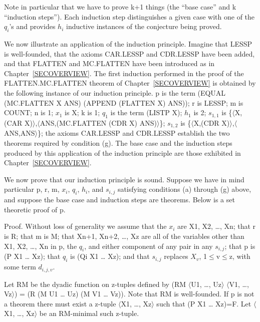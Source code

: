 \documentclass[11pt]{book}
\begin{document}
\nopagebreak\par\hrulefill\nopagebreak\par
Note in particular that we have to prove k+1 things (the ``base case'' and k
``induction steps'').  Each induction step distinguishes a given case with
one of the $q_{i}$'s and provides $h_{i}$ inductive instances of the conjecture
being proved.

We now illustrate an application of the induction principle.
Imagine that LESSP is well-founded,
that the axioms CAR.LESSP and CDR.LESSP have been added, and that
FLATTEN and MC.FLATTEN have been introduced as in Chapter~\ref{SECOVERVIEW}.
The first induction performed in the proof of the FLAT\-TEN.MC.FLAT\-TEN
theorem of Chapter~\ref{SECOVERVIEW} is obtained by the following
instance of our induction principle.  p is the term (EQUAL (MC.FLAT\-TEN X ANS)
(APPEND (FLATTEN X) ANS)); r is LESSP; m is COUNT; n is 1; $x_{1}$ is X;
k is 1; $q_{1}$ is the term (LISTP X); $h_{1}$ is 2; $s_{1,1}$ is
\{$\langle$X,(CAR X)$\rangle$,$\langle$ANS,(MC.FLAT\-TEN (CDR X) ANS)$\rangle$\}; $s_{1,2}$ is
\{$\langle$X,(CDR X)$\rangle$,$\langle$ANS,ANS$\rangle$\}; the axioms CAR.LESSP and CDR.LESSP establish
the two theorems required by condition (g).  The base case and the induction
steps produced by this application of the induction principle
are those exhibited in Chapter~\ref{SECOVERVIEW}.

We now prove that our induction principle is sound.
Suppose we have in mind particular p, r, m, $x_{i}$,
$q_{i}$, $h_{i}$, and $s_{i,j}$ satisfying conditions (a) through
(g) above, and suppose the base case and induction steps are
theorems.  Below is a set theoretic proof of p.

Proof.  Without loss of generality we assume that the
$x_{i}$ are X1, X2, \ldots{}, Xn; that r is R; that m is M;
that Xn+1, Xn+2, \ldots{}, Xz are all of the variables other
than X1, X2, \ldots{}, Xn in p, the $q_{i}$, and either component
of any pair in any $s_{i,j}$; that p is (P X1 \ldots{} Xz); that
$q_{i}$ is (Qi X1 \ldots{} Xz); and that $s_{i,j}$ replaces $X_{v}$, 1$\leq$v$\leq$z,
with some term $d_{i,j,v}$.

Let RM be the dyadic function on z-tuples defined by
(RM $\langle$U1, \ldots{}, Uz$\rangle$ $\langle$V1, \ldots{}, Vz$\rangle$) = (R (M U1 \ldots{} Uz) (M V1 \ldots{} Vz)).
Note that RM is well-founded.  If p is not a theorem there must
exist a z-tuple $\langle$X1, \ldots{}, Xz$\rangle$ such that (P X1 \ldots{} Xz)=F.
Let $\langle$X1, \ldots{}, Xz$\rangle$ be an RM-minimal such z-tuple.
\end{document}

